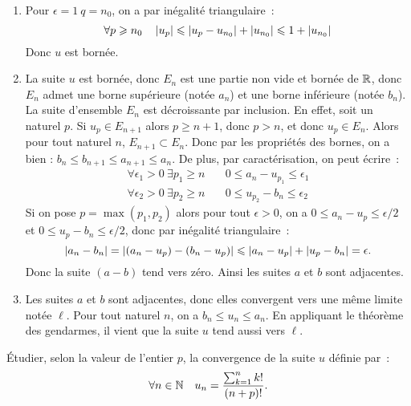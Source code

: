 \begin{enumerate}
    \item Pour \(\epsilon = 1 \ q = n_0\), on a par inégalité triangulaire~:
        \[ \forall p \geqslant n_0 \quad \left\lvert u_p\right\rvert \leqslant \left\lvert u_p - u_{n_0}\right\rvert + \left\lvert u_{n_0}\right\rvert \leqslant 1 + \left\lvert u_{n_0}\right\rvert\]
        Donc \(u\) est bornée.
    \item La suite \(u\) est bornée, donc \(E_n\) est une partie non vide et bornée de \(\mathbb{R}\), donc \(E_n\) admet une borne supérieure (notée \(a_n\)) et une borne inférieure (notée \(b_n\)). La suite d'ensemble \(E_n\) est décroissante par inclusion. En effet, soit un naturel \(p\). Si \(u_p \in E_{n+1}\) alors \(p \geqslant n+1\), donc \(p > n\), et donc \(u_p \in E_n\). Alors pour tout naturel \(n\), \(E_{n+1} \subset E_n\). Donc par les propriétés des bornes, on a bien : \(b_n \leqslant b_{n+1} \leqslant a_{n+1} \leqslant a_n\). De plus, par caractérisation, on peut écrire~:
        \begin{align*}
            \forall \epsilon_1 >0 \ \exists p_1 \geqslant n & \quad 0 \leqslant a_n - u_{p_1} \leqslant \epsilon_1 \\
            \forall \epsilon_2 >0 \ \exists p_2 \geqslant n & \quad 0 \leqslant u_{p_2} - b_n \leqslant \epsilon_2
        \end{align*}
Si on pose \(p = \max(p_1,p_2)\) alors pour tout \(\epsilon>0\), on a \(0 \leqslant a_n-u_p \leqslant \epsilon/2\) et \(0 \leqslant u_p-b_n \leqslant \epsilon/2\), donc par inégalité triangulaire~:
\[ \left\lvert a_n - b_n\right\rvert = \left\lvert(a_n-u_p) - (b_n-u_p)\right\rvert \leqslant \left\lvert a_n-u_p\right\rvert + \left\lvert u_p-b_n\right\rvert = \epsilon. \]
Donc la suite \((a-b)\) tend vers zéro. Ainsi les suites \(a\) et \(b\) sont adjacentes.
\item Les suites \(a\) et \(b\) sont adjacentes, donc elles convergent vers une même limite notée \(\ell\). Pour tout naturel \(n\), on a \(b_n \leqslant u_n \leqslant a_n\). En appliquant le théorème des gendarmes, il vient que la suite \(u\) tend aussi vers \(\ell\).
\end{enumerate}
\begin{exercice}
    Étudier, selon la valeur de l'entier \(p\), la convergence de la suite \(u\) définie par~: \[\forall n \in \mathbb{N} \quad u_n = \frac{\sum_{k = 1}^n k!}{(n+p)!}.\]
\end{exercice}

